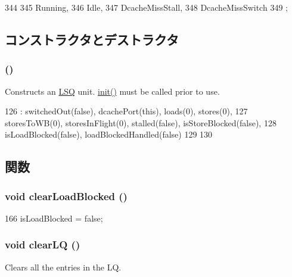 \begin{DoxyCode}
344                 {
345         Running,
346         Idle,
347         DcacheMissStall,
348         DcacheMissSwitch
349     };
\end{DoxyCode}


\subsection{コンストラクタとデストラクタ}
\hypertarget{classOzoneLWLSQ_aa933366a7f11b182f805d690c533776a}{
\subsubsection[{OzoneLWLSQ}]{ ()}}
\label{classOzoneLWLSQ_aa933366a7f11b182f805d690c533776a}
Constructs an \hyperlink{classLSQ}{LSQ} unit. \hyperlink{classOzoneLWLSQ_ae8565b0968a8115705f1585e8aa21f75}{init()} must be called prior to use. 


\begin{DoxyCode}
126     : switchedOut(false), dcachePort(this), loads(0), stores(0),
127       storesToWB(0), storesInFlight(0), stalled(false), isStoreBlocked(false),
128       isLoadBlocked(false), loadBlockedHandled(false)
129 {
130 }
\end{DoxyCode}


\subsection{関数}
\hypertarget{classOzoneLWLSQ_aaa9628e569d007b553e6830774b8548c}{
\subsubsection[{clearLoadBlocked}]{\setlength{\rightskip}{0pt plus 5cm}void clearLoadBlocked ()}}
\label{classOzoneLWLSQ_aaa9628e569d007b553e6830774b8548c}



\begin{DoxyCode}
166     { isLoadBlocked = false; }
\end{DoxyCode}
\hypertarget{classOzoneLWLSQ_ae3af532345dbe6519e8272d9cd677230}{
\subsubsection[{clearLQ}]{\setlength{\rightskip}{0pt plus 5cm}void clearLQ ()}}
\label{classOzoneLWLSQ_ae3af532345dbe6519e8272d9cd677230}
Clears all the entries in the LQ. 



